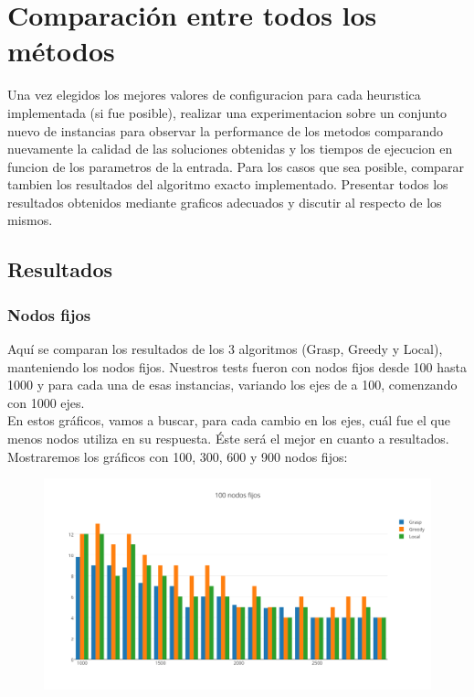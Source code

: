 \section{Comparaci\'on entre todos los m\'etodos}

Una vez elegidos los mejores valores de configuracion para cada heurıstica implementada (si fue posible), realizar una experimentacion sobre un conjunto nuevo de instancias para observar la performance
de los metodos comparando nuevamente la calidad de las soluciones obtenidas y los tiempos de ejecucion en funcion de los parametros de la entrada. 
Para los casos que sea posible, comparar tambien los resultados del algoritmo exacto implementado.
Presentar todos los resultados obtenidos mediante graficos adecuados y discutir al respecto de los mismos.
\subsection{Resultados}
\subsubsection{Nodos fijos}
Aqu\'i se comparan los resultados de los 3 algoritmos (Grasp, Greedy y Local), manteniendo los nodos fijos. Nuestros tests fueron con nodos fijos desde 100 hasta 1000 y para cada una de esas instancias,
variando los ejes de a 100, comenzando con 1000 ejes.\\

En estos gr\'aficos, vamos a buscar, para cada cambio en los ejes, cu\'al fue el que menos nodos utiliza en su respuesta. \'Este ser\'a el mejor en cuanto a resultados.\\

Mostraremos los gr\'aficos con 100, 300, 600 y 900 nodos fijos:

 \begin{figure}[h!]
   \begin{center}
 	\includegraphics[scale=0.7]{imagenes/6/100NodosFijos.png}
   \end{center}
 \end{figure}
 
